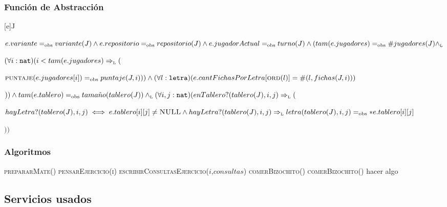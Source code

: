 \subsubsection*{Función de Abstracción}
[e]{J}{$
  e.variante=_{\mathrm{obs}} variante(J)\land\\
  e.repositorio=_{\mathrm{obs}} repositorio(J)\land\\
  e.jugadorActual=_{\mathrm{obs}} turno(J)\land\\
  (tam(e.jugadores)=_{\mathrm{obs}} \#jugadores(J)\land_{\mathrm{\scriptscriptstyle{L}}}$
  \begin{adjustwidth}{11.4em}{0em}
  $(\forall i:\texttt{nat})(i<tam(e.jugadores)\Rightarrow_{\mathrm{\scriptscriptstyle{L}}}($
  \begin{adjustwidth}{2em}{0em}
    $
    \textsc{puntaje}(e.jugadores[i])=_{\mathrm{obs}} puntaje(J,i)))\land\\
    (\forall l:\texttt{letra})(e.cantFichasPorLetra[\textsc{ord}(l)]=\#(l,fichas(J,i)))
    $
  \end{adjustwidth}$))\land\\
  tam(e.tablero)=_{\mathrm{obs}} tama\tilde{n}o(tablero(J))\land_{\mathrm{\scriptscriptstyle{L}}}\\
  (\forall i,j:\texttt{nat})(enTablero?(tablero(J),i,j)\Rightarrow_{\mathrm{\scriptscriptstyle{L}}}($
  \begin{adjustwidth}{2em}{0em}
    $
      hayLetra?(tablero(J),i,j)\iff e.tablero[i][j]\neq\textsc{NULL}\land\\
      hayLetra?(tablero(J),i,j)\Rightarrow_{\mathrm{\scriptscriptstyle{L}}} letra(tablero(J),i,j)=_{\mathrm{obs}} *e.tablero[i][j]
    $
  \end{adjustwidth}$))$
  \end{adjustwidth}
}

\subsubsection*{Algoritmos}
\begin{algorithm}[H]
  \begin{algorithmic}[1]
    \State{} 
    \State{} 
    \State{}
    \State\textsc{prepararMate()} 
    \State\textsc{pensarEjercicio(i)}
      \State\textsc{escribirConsultasEjercicio($i$,$consultas$)}
    \Else
      \State\textsc{comerBizochito()}
    \EndIf
      \State\textsc{comerBizochito()}
    \EndWhile
         \State hacer algo
    \EndFor
    \State{}
  \end{algorithmic}
\end{algorithm}

\subsection{Servicios usados}
\newpage

